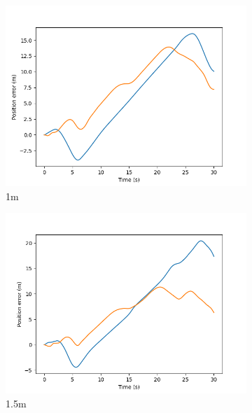 \documentclass[class=article, crop=false]{standalone}
\begin{document}
\begin{figure}
\begin{subfigure}[b]{0.48\textwidth}
        \includegraphics{scenario1/rov-100m/1.0m/usv_pos_error_controlled}
        \caption{1m}
        \label{}
    \end{subfigure}
    \hfill
        \begin{subfigure}[b]{0.48\textwidth}
        \centering
        \includegraphics{scenario1/rov-100m/1.5m/usv_pos_error_controlled}
        \caption{1.5m}
        \label{}
    \end{subfigure}
    \vfill
        \begin{subfigure}[b]{0.48\textwidth}
        \centering

\end{subfigure}
\end{figure}
\end{document}
